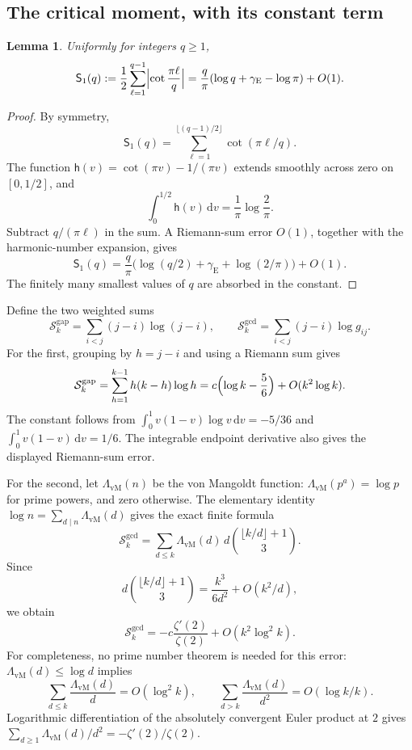 \documentclass[11pt]{article}
\numberwithin{equation}{section}
\newtheorem{lemma}[theorem]{Lemma}
\theoremstyle{definition}
\theoremstyle{remark}
\newcommand{\dd}{\,\mathrm d}
\newcommand{\gE}{\gamma_{\mathrm E}}
\newcommand{\vM}{\Lambda_{\mathrm{vM}}}
\begin{document}
\subsection{The critical moment, with its constant term}

\begin{lemma}\label{mxc:hz:lem:cot-absolute}
Uniformly for integers $q\ge1$,
\begin{equation}\label{mxc:hz:eq:cot-absolute}
 \mathsf S_1(q):=\frac12\sum_{\ell=1}^{q-1}\Bigl|\cot\frac{\pi\ell}{q}\Bigr|
 =\frac q\pi(\log q+\gE-\log\pi)+O(1).
\end{equation}
\end{lemma}

\begin{proof}
By symmetry,
\[
 \mathsf S_1(q)=\sum_{\ell=1}^{\lfloor(q-1)/2\rfloor}\cot(\pi\ell/q).
\]
The function $\mathsf h(v)=\cot(\pi v)-1/(\pi v)$ extends smoothly across
zero on $[0,1/2]$, and
\[
 \int_0^{1/2}\mathsf h(v)\dd v=\frac1\pi\log\frac2\pi.
\]
Subtract $q/(\pi\ell)$ in the sum. A Riemann-sum error $O(1)$, together
with the harmonic-number expansion, gives
\[
 \mathsf S_1(q)=\frac q\pi\bigl(\log(q/2)+\gE+\log(2/\pi)\bigr)+O(1).
\]
The finitely many smallest values of $q$ are absorbed in the constant.
\end{proof}

Define the two weighted sums
\[
 \mathcal S^{\mathrm{gap}}_k=\sum_{i<j}(j-i)\log(j-i),\qquad
 \mathcal S^{\gcd}_k=\sum_{i<j}(j-i)\log g_{ij}.
\]
For the first, grouping by $h=j-i$ and using a Riemann sum gives
\begin{equation}\label{mxc:hz:eq:gap-log}
 \mathcal S^{\mathrm{gap}}_k
 =\sum_{h=1}^{k-1}h(k-h)\log h
 =c\Bigl(\log k-\frac56\Bigr)+O(k^2\log k).
\end{equation}
The constant follows from $\int_0^1v(1-v)\log v\dd v=-5/36$ and
$\int_0^1v(1-v)\dd v=1/6$. The integrable endpoint derivative also gives
the displayed Riemann-sum error.

For the second, let $\vM(n)$ be the von Mangoldt function:
$\vM(p^a)=\log p$ for prime powers, and zero otherwise. The elementary
identity $\log n=\sum_{d\mid n}\vM(d)$ gives the exact finite formula
\begin{equation}\label{mxc:hz:eq:gcd-log-exact}
 \mathcal S^{\gcd}_k=\sum_{d\le k}\vM(d)\,d\binom{\lfloor k/d\rfloor+1}{3}.
\end{equation}
Since
\[
 d\binom{\lfloor k/d\rfloor+1}{3}=\frac{k^3}{6d^2}+O(k^2/d),
\]
we obtain
\begin{equation}\label{mxc:hz:eq:gcd-log}
 \mathcal S^{\gcd}_k=-c\frac{\zeta'(2)}{\zeta(2)}+O(k^2\log^2k).
\end{equation}
For completeness, no prime number theorem is needed for this error:
$\vM(d)\le\log d$ implies
\[
 \sum_{d\le k}\frac{\vM(d)}d=O(\log^2k),\qquad
 \sum_{d>k}\frac{\vM(d)}{d^2}=O(\log k/k).
\]
Logarithmic differentiation of the absolutely convergent Euler product at
$2$ gives $\sum_{d\ge1}\vM(d)/d^2=-\zeta'(2)/\zeta(2)$.
\end{document}
